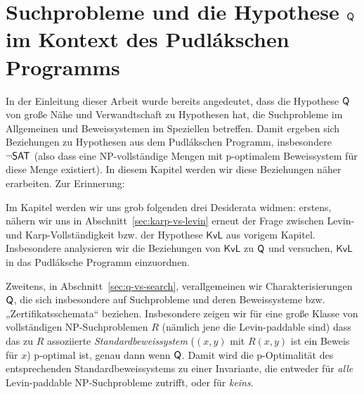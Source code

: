 \chapter{Suchprobleme und die Hypothese $\mathsf{Q}$ im Kontext des Pudlákschen Programms}\label{chap:pudlak}


In der Einleitung dieser Arbeit wurde bereits angedeutet, dass die Hypothese $\mathsf{Q}$ von \citeauthor{fenner_inverting_2003} große Nähe und Verwandtschaft zu Hypothesen hat, die Suchprobleme im Allgemeinen und Beweissystemen im Speziellen betreffen. Damit ergeben sich Beziehungen zu Hypothesen aus dem Pudlákschen Programm, insbesondere $\neg\mathsf{SAT}$ (also dass eine NP-vollständige Mengen mit p-optimalem Beweissystem für diese Menge existiert).
In diesem Kapitel werden wir diese Beziehungen näher erarbeiten. Zur Erinnerung:

\conjq*

Im Kapitel werden wir uns grob folgenden drei Desiderata widmen: 
erstens, nähern wir uns in Abschnitt~\ref{sec:karp-vs-levin} erneut der Frage zwischen Levin- und Karp-Vollständigkeit bzw. der Hypothese $\mathsf{KvL}$ aus vorigem Kapitel. Insbesondere analysieren wir die Beziehungen von $\mathsf{KvL}$ zu $\mathsf{Q}$ und versuchen, $\mathsf{KvL}$ in das Pudláksche Programm einzuordnen.

Zweitens, in Abschnitt~\ref{sec:q-vs-search}, verallgemeinen wir Charakterisierungen $\mathsf{Q}$, die sich insbesondere auf Suchprobleme und deren Beweissysteme bzw. „Zertifikatsschemata“ beziehen.
Insbesondere zeigen wir für eine große Klasse von vollständigen NP-Suchproblemen $R$ (nämlich jene die Levin-paddable sind) dass das zu $R$ assoziierte \emph{Standardbeweissystem} ($(x,y)$ mit $R(x,y)$ ist ein Beweis für $x$) p-optimal ist, genau dann wenn $\mathsf{Q}$. Damit wird die p-Optimalität des entsprechenden Standardbeweissystems zu einer Invariante, die entweder für \emph{alle} Levin-paddable NP-Suchprobleme zutrifft, oder für \emph{keins}.



